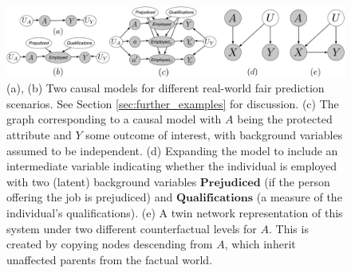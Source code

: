 \begin{figure}
\centerline{\includegraphics[width=\textwidth]{best_of_both.pdf}}
\caption{\label{fig:ex1}
    (a), (b) Two causal models for different
    real-world fair prediction scenarios.\label{figure.simple_models}
    See Section \ref{sec:further_examples} for discussion.
    (c) The graph corresponding to
    a causal model with $A$ being the protected attribute and $Y$ some
    outcome of interest, with background variables assumed to be
    independent. (d) Expanding the model to include an intermediate
    variable indicating whether the individual is employed with two
    (latent) background variables $\textbf{Prejudiced}$ (if the person
    offering the job is prejudiced) and $\textbf{Qualifications}$ (a
    measure of the individual's qualifications). (e) A twin network
    representation of this system \citep{pearl:00} under two different
    counterfactual levels for $A$. This is created by copying nodes
    descending from $A$, which inherit unaffected parents from the
    factual world.}
\end{figure}

